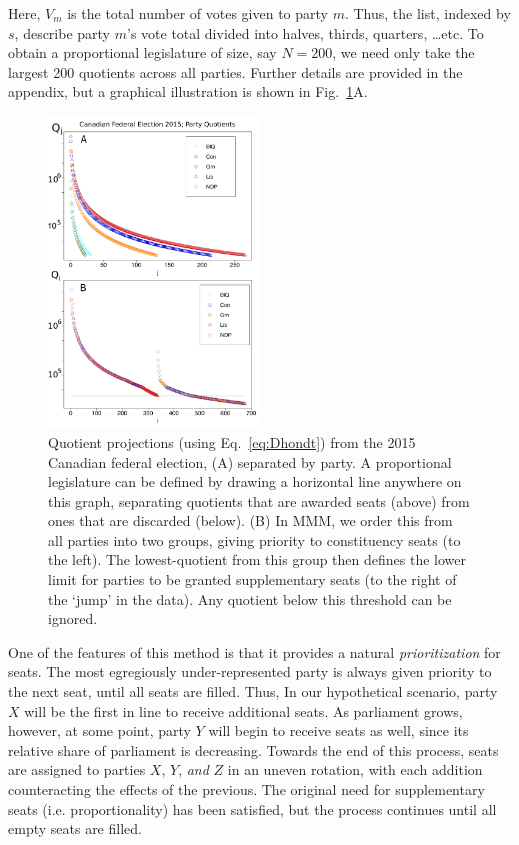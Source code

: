 \documentclass[DIV=calc, paper=a4, fontsize=11pt, twocolumn]{scrartcl}	 %
\begin{document}
Here, $V_m$ is the total number of votes given to party $m$. Thus, the list, indexed by $s$, describe party $m$'s vote total divided into halves, thirds, quarters, \ldots etc. To obtain a proportional legislature of size, say $N=200$, we need only take the largest 200 quotients across all parties. Further details are provided in the appendix, but a graphical illustration is shown in Fig.~\ref{fig:ordered quotients}A. 

\begin{figure}[h!]
  \includegraphics[width=0.50\textwidth,clip]{Figs/2015_quotients_figure_composite}
  \captionsetup{format=default}
  \caption{Quotient projections (using Eq.~\ref{eq:Dhondt}) from the 2015 Canadian federal election, (A) separated by party. A proportional legislature can be defined by drawing a horizontal line anywhere on this graph, separating quotients that are awarded seats (above) from ones that are discarded (below). (B) In MMM, we order this from all parties into two groups, giving priority to constituency seats (to the left). The lowest-quotient from this group then defines the lower limit for parties to be granted supplementary seats (to the right of the `jump' in the data). Any quotient below this threshold can be ignored.}
\label{fig:ordered quotients}
\end{figure}

One of the features of this method is that it provides a natural \emph{prioritization} for seats. The most egregiously under-represented party is always given priority to the next seat, until all seats are filled. 
Thus, In our hypothetical scenario, party $X$ will be the first in line to receive additional seats. As parliament grows, however, at some point, party $Y$ will begin to receive seats as well, since its relative share of parliament is decreasing. 
Towards the end of this process, seats are assigned to parties $X$, $Y$, \emph{and} $Z$ in an uneven rotation, with each addition counteracting the effects of the previous. The original need for supplementary seats (i.e. proportionality) has been satisfied, but the process continues until all empty seats are filled. 
\end{document}

